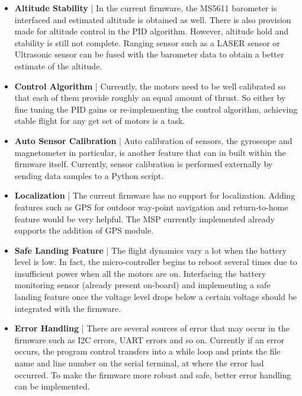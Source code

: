 \documentclass[a4paper,12pt,oneside]{book}
\begin{document}
{\begin{itemize}
\item \textbf{Altitude Stability} | In the current firmware, the MS5611 barometer is interfaced and estimated altitude is obtained as well. There is also provision made for altitude control in the PID algorithm. However, altitude hold and stability is still not complete. Ranging sensor such as a LASER sensor or Ultrasonic sensor can be fused with the barometer data to obtain a better estimate of the altitude.\\

\item \textbf{Control Algorithm} | Currently, the motors need to be well calibrated so that each of them provide roughly an equal amount of thrust. So either by fine  tuning the PID gains or re-implementing the control algorithm, achieving stable flight for any get set of motors is a task.\\

\item \textbf{Auto Sensor Calibration} | Auto calibration of sensors, the gyroscope and magnetometer in particular, is another feature that can in built within the firmware itself. Currently, sensor calibration is performed externally by sending data samples to a Python script.

\item \textbf{Localization} | The current firmware has no support for localization. Adding features such as GPS for outdoor way-point navigation and return-to-home feature would be very helpful. The MSP currently implemented already supports the addition of GPS module.\\

\item \textbf{Safe Landing Feature} | The flight dynamics vary a lot when the battery level is low. In fact, the micro-controller begins to reboot several times due to insufficient power when all the motors are on. Interfacing the battery monitoring sensor (already present on-board) and implementing a safe landing feature once the voltage level drops below a certain voltage should be integrated with the firmware.\\

\item \textbf{Error Handling} | There are several sources of error that may occur in the firmware such as I2C errors, UART errors and so on. Currently if an error occurs, the program control transfers into a while loop and prints the file name and line number on the serial terminal, at where the error had occurred. To make the firmware more robust and safe, better error handling can be implemented.\\  


\end{itemize}}
\end{document}
